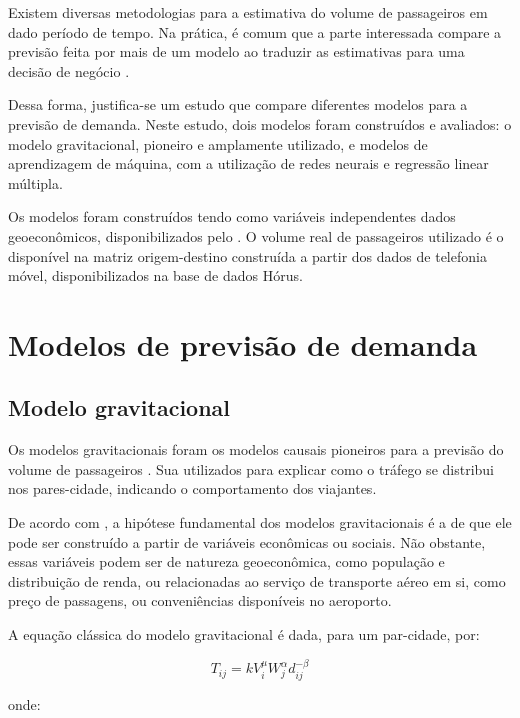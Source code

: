 \documentclass[12pt]{article}
\begin{document}
Existem diversas metodologias para a estimativa do volume de passageiros
em dado período de tempo. Na prática, é comum que a parte interessada
compare a previsão feita por mais de um modelo ao traduzir as
estimativas para uma decisão de negócio \citep{Grosche2007}.

Dessa forma, justifica-se um estudo que compare diferentes modelos para
a previsão de demanda. Neste estudo, dois modelos foram construídos e
avaliados: o modelo gravitacional, pioneiro e amplamente utilizado, e
modelos de aprendizagem de máquina, com a utilização de redes neurais e
regressão linear múltipla.

Os modelos foram construídos tendo como variáveis independentes dados
geoeconômicos, disponibilizados pelo \citet{atlasIpea}. O volume real de
passageiros utilizado é o disponível na matriz origem-destino construída
a partir dos dados de telefonia móvel, disponibilizados na base de dados
Hórus.

\hypertarget{modelos-de-previsuxe3o-de-demanda}{%
\section{Modelos de previsão de
demanda}\label{modelos-de-previsuxe3o-de-demanda}}

\hypertarget{modelo-gravitacional}{%
\subsection{Modelo gravitacional}\label{modelo-gravitacional}}

Os modelos gravitacionais foram os modelos causais pioneiros para a
previsão do volume de passageiros \citep{Grosche2007}. Sua utilizados
para explicar como o tráfego se distribui nos pares-cidade, indicando o
comportamento dos viajantes.

De acordo com \citet{Grosche2007}, a hipótese fundamental dos modelos
gravitacionais é a de que ele pode ser construído a partir de variáveis
econômicas ou sociais. Não obstante, essas variáveis podem ser de
natureza geoeconômica, como população e distribuição de renda, ou
relacionadas ao serviço de transporte aéreo em si, como preço de
passagens, ou conveniências disponíveis no aeroporto.

A equação clássica do modelo gravitacional é dada, para um par-cidade,
por:

\[T_{ij} = k V_i^\mu W_j^\alpha d_{ij}^{-\beta} \]

onde:
\end{document}
